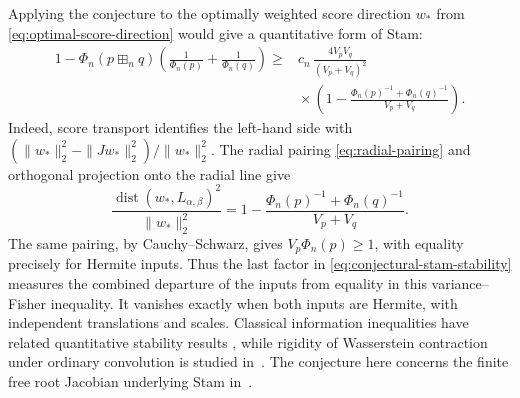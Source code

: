 \documentclass[12pt,reqno]{amsart}
\theoremstyle{definition}
\theoremstyle{remark}
\begin{document}
Applying the conjecture to the optimally weighted score direction \(w_*\) from \eqref{eq:optimal-score-direction} would give a quantitative form of Stam:
\begin{equation}\label{eq:conjectural-stam-stability}
\begin{split}
 1-\Phi_n(p\boxplus_nq)
       \left(\frac1{\Phi_n(p)}+\frac1{\Phi_n(q)}\right)
 \geq {}&c_n\,\frac{4V_pV_q}{(V_p+V_q)^2}\\
 &\mathrel{}\times
 \left(1-\frac{\Phi_n(p)^{-1}+\Phi_n(q)^{-1}}{V_p+V_q}\right).
\end{split}
\end{equation}
Indeed, score transport identifies the left-hand side with \((\|w_*\|_2^2-\|Jw_*\|_2^2)/\|w_*\|_2^2\). The radial pairing \eqref{eq:radial-pairing} and orthogonal projection
onto the radial line give
\[
 \frac{\operatorname{dist}(w_*,L_{\alpha,\beta})^2}{\|w_*\|_2^2}
 =1-\frac{\Phi_n(p)^{-1}+\Phi_n(q)^{-1}}{V_p+V_q}.
\]
The same pairing, by Cauchy--Schwarz, gives \(V_p\Phi_n(p)\geq1\), with equality precisely for Hermite inputs. Thus the last factor in \eqref{eq:conjectural-stam-stability} measures the combined departure of the inputs from equality in this variance--Fisher inequality. It vanishes exactly when both inputs are Hermite, with independent translations and scales. Classical information
inequalities have related quantitative stability results \cite{CourtadeFathiPananjady18}, while rigidity of Wasserstein contraction under ordinary convolution is studied in~\cite{FathiGoldmanTsodyks25}. The conjecture here concerns the finite free root Jacobian underlying Stam in~\cite{GVS26}.
\end{document}
